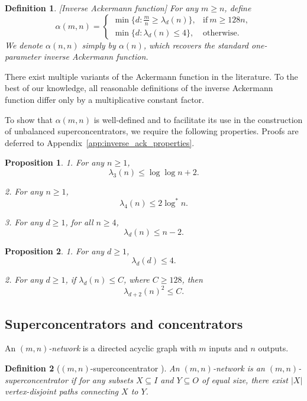 \documentclass[11pt]{article}
\newtheorem{definition}{Definition}
\newtheorem{proposition}{Proposition}
\begin{document}
\begin{definition}
\label{def:inv_ack}
[Inverse Ackermann function] For any $m \ge n$, define
\begin{equation}
    \alpha(m, n) =
    \begin{cases}
      \min\{ d : \frac{m}{n} \ge \lambda_d(n) \}, & \text{if}\ m \ge 128 n, \\
      \min\{ d : \lambda_d(n) \le 4 \}, & \text{otherwise.}
    \end{cases}
\end{equation}
We denote $\alpha(n, n)$ simply by $\alpha(n)$, which recovers the standard one-parameter inverse Ackermann function.
\end{definition}

There exist multiple variants of the Ackermann function in the literature. To the best of our knowledge, all reasonable definitions of the inverse Ackermann function differ only by a multiplicative constant factor.

To show that $\alpha(m, n)$ is well-defined and to facilitate its use in the construction of unbalanced superconcentrators, we require the following properties. Proofs are deferred to Appendix~\ref{app:inverse_ack_properties}.


\begin{proposition}
\label{prop:u34d_ub}
	1. For any $n \ge 1$,
\[
\lambda_3(n) \le \log\log n + 2.
\]

2. For any $n \ge 1$,
\[
\lambda_4(n) \le 2 \log^*n.
\]

3. For any $d \ge 1$, for all $n \ge 4$,
\[
\lambda_d(n) \le n-2.
\]
\end{proposition}


\begin{proposition}
\label{prop:alpha_well_defined}
1. For any $d \ge 1$,
\[
\lambda_d(d) \le 4.
\]

2. For any $d \ge 1$, if $\lambda_d(n) \le C$, where $C \ge 128$, then
\[
\lambda_{d+2}(n)^2 \le C.
\]
\end{proposition}




\subsection{Superconcentrators and concentrators}

An \emph{$(m, n)$-network} is a directed acyclic graph with $m$ inputs and $n$ outputs.


\begin{definition} [$(m, n)$-superconcentrator \cite{Val77}]
An $(m, n)$-network is an \emph{$(m, n)$-superconcentrator} if for any subsets $X \subseteq I$ and $Y \subseteq O$ of equal size, there exist $|X|$ vertex-disjoint paths connecting $X$ to $Y$.
\end{definition}
\end{document}

